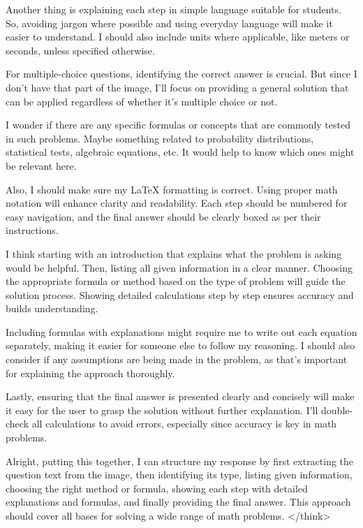 \documentclass[12pt]{article}
\begin{document}
Another thing is explaining each step in simple language suitable for students. So, avoiding jargon where possible and using everyday language will make it easier to understand. I should also include units where applicable, like meters or seconds, unless specified otherwise.

For multiple-choice questions, identifying the correct answer is crucial. But since I don't have that part of the image, I'll focus on providing a general solution that can be applied regardless of whether it's multiple choice or not.

I wonder if there are any specific formulas or concepts that are commonly tested in such problems. Maybe something related to probability distributions, statistical tests, algebraic equations, etc. It would help to know which ones might be relevant here.

Also, I should make sure my LaTeX formatting is correct. Using proper math notation will enhance clarity and readability. Each step should be numbered for easy navigation, and the final answer should be clearly boxed as per their instructions.

I think starting with an introduction that explains what the problem is asking would be helpful. Then, listing all given information in a clear manner. Choosing the appropriate formula or method based on the type of problem will guide the solution process. Showing detailed calculations step by step ensures accuracy and builds understanding.

Including formulas with explanations might require me to write out each equation separately, making it easier for someone else to follow my reasoning. I should also consider if any assumptions are being made in the problem, as that's important for explaining the approach thoroughly.

Lastly, ensuring that the final answer is presented clearly and concisely will make it easy for the user to grasp the solution without further explanation. I'll double-check all calculations to avoid errors, especially since accuracy is key in math problems.

Alright, putting this together, I can structure my response by first extracting the question text from the image, then identifying its type, listing given information, choosing the right method or formula, showing each step with detailed explanations and formulas, and finally providing the final answer. This approach should cover all bases for solving a wide range of math problems.
</think>
\end{document}
